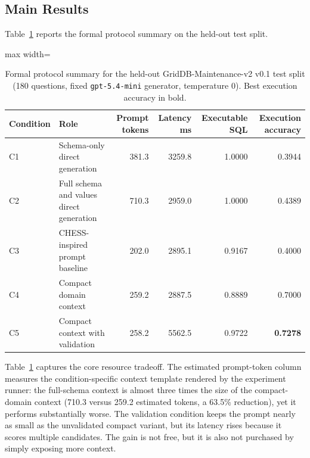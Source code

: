 \documentclass[applsci,article,submit,moreauthors]{Definitions/mdpi}
\begin{document}
\subsection{Main Results}\label{sect:r1}

Table~\ref{tab:main-results} reports the formal protocol summary on the held-out test split.

\begin{table}[H]
\small{\small}
\caption{Formal protocol summary for the held-out GridDB-Maintenance-v2 v0.1 test split (180 questions, fixed \texttt{gpt-5.4-mini} generator, temperature 0). Best execution accuracy in bold.}
\label{tab:main-results}
\centering
\begin{adjustbox}{max width=\textwidth}
\begin{tabular}{llrrrr}
\toprule
\textbf{Condition} & \textbf{Role} & \textbf{Prompt tokens} & \textbf{Latency ms} & \textbf{Executable SQL} & \textbf{Execution accuracy} \\
\midrule
C1 & Schema-only direct generation & 381.3 & 3259.8 & 1.0000 & 0.3944 \\
C2 & Full schema and values direct generation & 710.3 & 2959.0 & 1.0000 & 0.4389 \\
C3 & CHESS-inspired prompt baseline & 202.0 & 2895.1 & 0.9167 & 0.4000 \\
C4 & Compact domain context & 259.2 & 2887.5 & 0.8889 & 0.7000 \\
C5 & Compact context with validation & 258.2 & 5562.5 & 0.9722 & \textbf{0.7278} \\
\bottomrule
\end{tabular}
\end{adjustbox}
\end{table}

Table~\ref{tab:main-results} captures the core resource tradeoff. The estimated prompt-token column measures the condition-specific context template rendered by the experiment runner: the full-schema context is almost three times the size of the compact-domain context (710.3 versus 259.2 estimated tokens, a 63.5\% reduction), yet it performs substantially worse. The validation condition keeps the prompt nearly as small as the unvalidated compact variant, but its latency rises because it scores multiple candidates. The gain is not free, but it is also not purchased by simply exposing more context.
\end{document}

